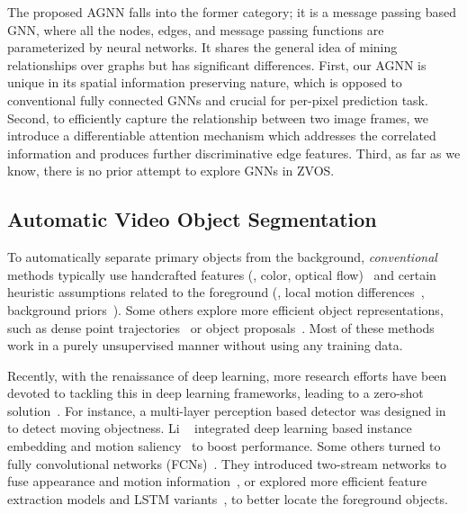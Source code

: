 \documentclass[10pt,twocolumn,letterpaper]{article}
\begin{document}
The proposed AGNN falls into the former category; it is a message passing based GNN, where all the nodes, edges, and message passing functions are parameterized by neural networks. It shares the general
idea of mining relationships over graphs but has significant
differences. First, our AGNN is unique in its spatial information preserving nature, which is opposed to conventional fully connected GNNs and crucial for per-pixel prediction task. Second, to efficiently capture the relationship between two image frames, we introduce a  differentiable attention mechanism which addresses the correlated information and produces further discriminative edge features. Third, as far as we know, there is no prior attempt to explore GNNs in ZVOS.
	\vspace*{-3pt}
\subsection{Automatic Video Object Segmentation}
	\vspace*{-2pt}	
\label{sec:vos}
To automatically separate primary objects from the background, \textit{conventional} methods typically use handcrafted features (\eg, color, optical flow)~\cite{DBLP:conf/iccv/PapazoglouF13,DBLP:conf/bmvc/FaktorI14,tsai2016video,hu2018unsupervised} and certain heuristic assumptions related to the foreground (\ie, local motion differences~\cite{DBLP:conf/iccv/PapazoglouF13}, background priors~\cite{DBLP:conf/cvpr/WangSP15}). Some others explore more efficient object representations, such as dense point trajectories~\cite{DBLP:conf/iccv/OchsB11,DBLP:journals/pami/OchsMB14,wang2018semi} or object proposals~\cite{zhang2013,DBLP:conf/cvpr/KohK17,Koh_2018_ECCV,Lu_2018_ECCV}. Most of these methods work in a purely unsupervised manner without using any training data.

Recently, with the renaissance of deep learning, more research efforts have been devoted to tackling this in deep learning frameworks, leading to a zero-shot solution~\cite{fragkiadaki2015learning,jain2017fusionseg,DBLP:conf/iccv/TokmakovAS17,cheng2017segflow, Li_2018_CVPR,Li_2018_ECCV1,li2018flow,lu2019see}. For instance, a multi-layer perception based detector was designed in~\cite{fragkiadaki2015learning} to detect moving objectness. Li \etal~\cite{Li_2018_CVPR} integrated deep learning based instance embedding and motion saliency~\cite{Li_2018_CVPR} to boost performance. Some others turned to fully convolutional networks (FCNs)~\cite{cao2019triply,long2015fully,Ziqin2019RANet}. They introduced two-stream networks to fuse appearance and motion information~\cite{li2018flow,jain2017fusionseg,cheng2017segflow}, or explored more efficient feature extraction models and LSTM variants~\cite{Song_2018_ECCV}, to better locate the foreground objects.
\end{document}
